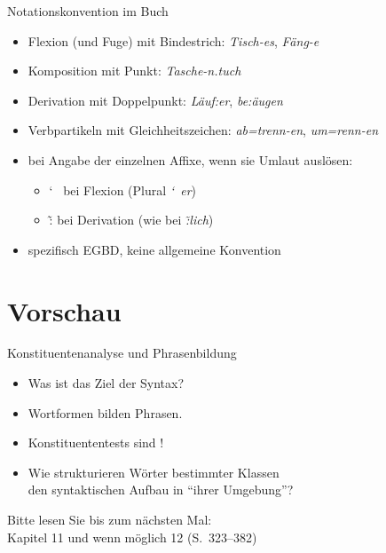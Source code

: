 \begin{frame}
  {Notationskonvention im Buch}
  \pause
  \begin{itemize}[<+->]
    \item \alert{Flexion (und Fuge)} mit Bindestrich: \textit{Tisch-es}, \textit{Fäng-e}
    \item \alert{Komposition} mit Punkt: \textit{Tasche-n.tuch}
    \item \alert{Derivation} mit Doppelpunkt: \textit{Läuf:er}, \textit{be:äugen}
    \item \alert{Verbpartikeln} mit Gleichheitszeichen: \textit{ab=trenn-en}, \textit{um=renn-en}
    \Halbzeile
    \item bei Angabe der einzelnen Affixe, wenn sie Umlaut auslösen:
      \begin{itemize}[<+->]
        \item \char`~ bei Flexion (Plural \textit{\char`~er})
        \item \~: bei Derivation (wie bei \textit{\~:lich})
      \end{itemize}
    \Halbzeile
  \item spezifisch EGBD, keine allgemeine Konvention
  \end{itemize}
\end{frame}

\section{Vorschau}

\begin{frame}
  {Konstituentenanalyse und Phrasenbildung}
  \pause
  \begin{itemize}[<+->]
    \item Was ist das Ziel der Syntax?
    \item Wortformen bilden \alert{Phrasen}.
    \item Konstituententests sind !
    \item Wie strukturieren Wörter bestimmter Klassen\\
      den syntaktischen Aufbau in "`ihrer Umgebung"'?
  \end{itemize}
  \pause
  \Zeile
  \begin{center}
    Bitte lesen Sie bis zum nächsten Mal:\\
    \alert{Kapitel 11 und wenn möglich 12 (S.~323--382)}
  \end{center}
\end{frame}



